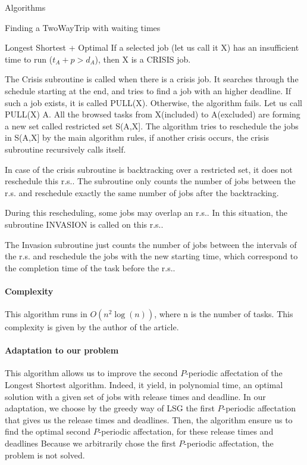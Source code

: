 \documentclass[a4paper,10pt]{report}
\begin{document}
\begin{chapter}{Algorithms}
\begin{section}{Finding a TwoWayTrip with waiting times}
\begin{subsection}{Longest Shortest + Optimal}
If a selected job (let us call it X) has an insufficient time to run ($t_A + p > d_A$), then X is a CRISIS job.

The Crisis subroutine is called when there is a crisis job. It searches through the schedule starting at the end,
and tries to find a job with an higher deadline.
If such a job exists, it is called PULL(X). Otherwise, the algorithm fails.
Let us call PULL(X) A.
All the browsed tasks from X(included) to A(excluded) are forming a new set called restricted set S(A,X].
The algorithm tries to reschedule the jobs in S(A,X] by the main algorithm rules, if another crisis occurs, the crisis subroutine recursively calls
itself.

In case of the crisis subroutine is backtracking over a restricted set, it does not reschedule this r.s.. The subroutine only counts
the number of jobs between the r.s. and reschedule exactly the same number of jobs after the backtracking.

During this rescheduling, some jobs may overlap an r.s.. In this situation, the subroutine INVASION is called on this r.s..

The Invasion subroutine just counts the number of jobs between the intervals of the r.s. and reschedule the jobs with the new starting time,
which correspond to the completion time of the task before the r.s..



\paragraph{Complexity}
This algorithm runs in $O(n^2 \log(n))$, where n is the number of tasks. This complexity is given by the author of the article.

\paragraph{Adaptation to our problem}
This algorithm allows us to improve the second $P$-periodic affectation of the Longest Shortest algorithm. 
Indeed, it yield, in polynomial time, an optimal solution with a given set of jobs with release times and deadline. 
In our adaptation, we choose by the greedy way of LSG the first $P$-periodic affectation that gives us the release times and deadlines. Then, the algorithm ensure us to find the optimal second $P$-periodic affectation, for these release times and deadlines
Because we arbitrarily chose the first $P$-periodic affectation, the problem is not solved.


\end{subsection}
\end{section}
\end{chapter}
\end{document}
